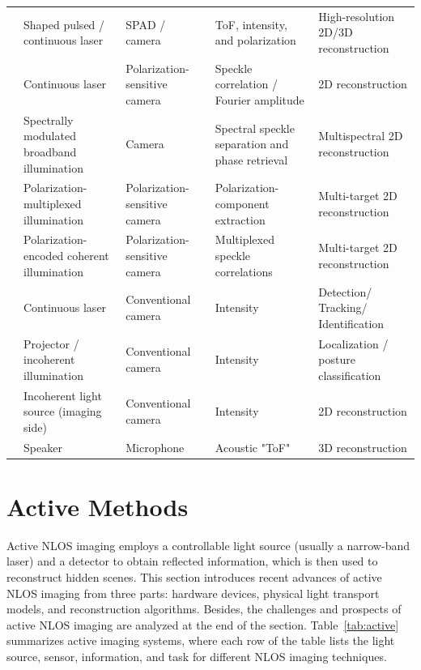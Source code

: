 \begin{table}[!t]
{\begin{tabular}{>{\raggedright}m{3.3cm}m{3.7cm}m{3cm}m{2cm}m{3cm}}
    \cite{zhaoLCPlanarNLOS2024,wangVectorialMultiviewNLOS2024,guoVectorialDigitelligentNLOS2025} & Shaped pulsed / continuous laser & SPAD / camera & ToF, intensity, and polarization & High-resolution 2D/3D reconstruction\\%
    \cite{liuPtychographyCorrelographyNLOS2026} & Continuous laser & Polarization-sensitive camera & Speckle correlation / Fourier amplitude & 2D reconstruction\\%
    \cite{weiMultispectralComponentSeparation2024} & Spectrally modulated broadband illumination & Camera & Spectral speckle separation and phase retrieval & Multispectral 2D reconstruction\\%
    \cite{zhaoPolarizationComponentExtraction2025} & Polarization-multiplexed illumination & Polarization-sensitive camera & Polarization-component extraction & Multi-target 2D reconstruction\\%
    \cite{weiPolarizationSpatialMultiplexing2026} & Polarization-encoded coherent illumination & Polarization-sensitive camera & Multiplexed speckle correlations & Multi-target 2D reconstruction\\%
    \cite{kleinTrackingObjectsOutside2016,smithTrackingMultipleObjects2018a,leiDirectObjectRecognition2019} & Continuous laser & Conventional camera & Intensity &  Detection/ Tracking/ Identification\\%
    \cite{chandranAdaptiveLightingDataDriven2019,chandranSpotlightWACV2024} & Projector / incoherent illumination & Conventional camera & Intensity &  Localization / posture classification\\%
    \cite{DBLP:journals/corr/abs-1810-11710} & Incoherent light source (imaging side) & Conventional camera & Intensity &  2D reconstruction\\%
    \cite{Lindell:2019:Acoustic} & Speaker & Microphone & Acoustic "ToF" &  3D reconstruction\\%
    \hline
    \end{tabular}}{}
    \end{table}%

\section{Active Methods} \label{sec2}
Active NLOS imaging employs a controllable light source (usually a narrow-band laser) and a detector to obtain reflected information, which is then used to reconstruct hidden scenes. This section introduces recent advances of active NLOS imaging from three parts: hardware devices, physical light transport models, and reconstruction algorithms. Besides, the challenges and prospects of active NLOS imaging are analyzed at the end of the section. Table~\ref{tab:active} summarizes active imaging systems, where each row of the table lists the light source, sensor, information, and task for different NLOS imaging techniques.

